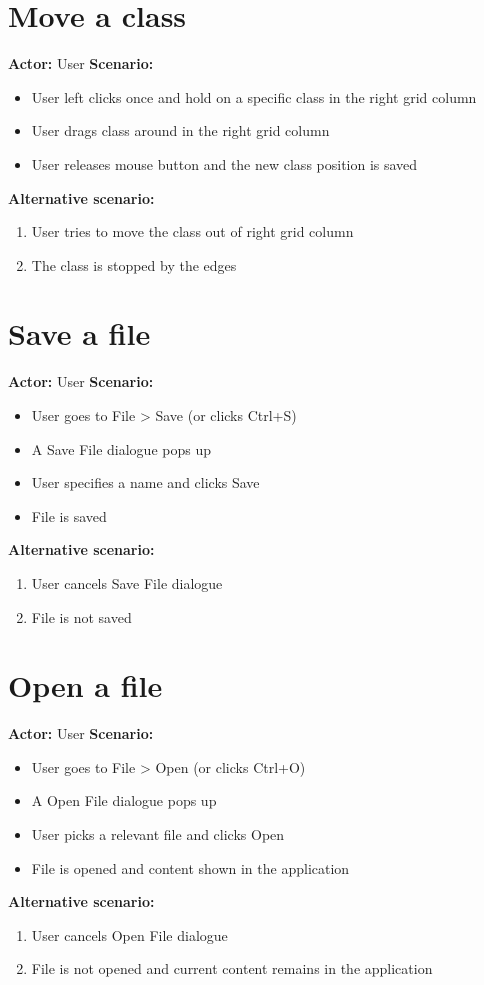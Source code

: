 \section{Move a class}
\textbf{Actor:} User
\textbf{Scenario:}
\begin{itemize}
\item User left clicks once and hold on a specific class in the right grid column
\item User drags class around in the right grid column
\item User releases mouse button and the new class position is saved
\end{itemize}
\textbf{Alternative scenario:} 
\begin{enumerate}
\item User tries to move the class out of right grid column
\item The class is stopped by the edges 
\end{enumerate}

\section{Save a file}
\textbf{Actor:} User
\textbf{Scenario:}
\begin{itemize}
\item User goes to File > Save (or clicks Ctrl+S)
\item A Save File dialogue pops up
\item User specifies a name and clicks Save
\item File is saved
\end{itemize}
\textbf{Alternative scenario:} 
\begin{enumerate}
\item User cancels Save File dialogue
\item File is not saved 
\end{enumerate}

\section{Open a file}
\textbf{Actor:} User
\textbf{Scenario:}
\begin{itemize}
\item User goes to File > Open (or clicks Ctrl+O)
\item A Open File dialogue pops up
\item User picks a relevant file and clicks Open
\item File is opened and content shown in the application
\end{itemize}
\textbf{Alternative scenario:} 
\begin{enumerate}
\item User cancels Open File dialogue
\item File is not opened and current content remains in the application 
\end{enumerate}